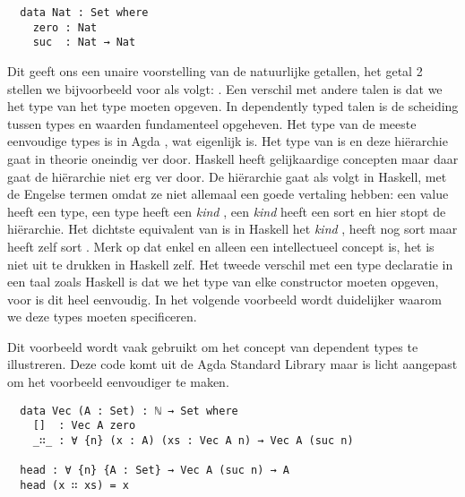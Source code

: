\begin{verbatim}
  data Nat : Set where
    zero : Nat
    suc  : Nat → Nat
\end{verbatim}

Dit geeft ons een unaire voorstelling van de natuurlijke getallen, het getal 2
stellen we bijvoorbeeld voor als volgt: . Een verschil
met andere talen is dat we het type van het type moeten opgeven.  In
dependently typed talen is de scheiding tussen types en waarden fundamenteel
opgeheven. Het type van de meeste eenvoudige types is in Agda , wat
eigenlijk  is. Het type van  is  en deze
hiërarchie gaat in theorie oneindig ver door. Haskell heeft gelijkaardige
concepten maar daar gaat de hiërarchie niet erg ver door. De hiërarchie gaat
als volgt in Haskell, met de Engelse termen omdat ze niet allemaal een goede
vertaling hebben: een value heeft een type, een type heeft een \emph{kind}
\cite{kind}, een \emph{kind} heeft een sort en hier stopt de hiërarchie. Het
dichtste equivalent van  is in Haskell het \emph{kind} \ihask{*},
\ihask{*} heeft nog sort  maar  heeft zelf sort
. Merk op dat  enkel en alleen een intellectueel concept
is, het is niet uit te drukken in Haskell zelf.  Het tweede verschil met een
type declaratie in een taal zoals Haskell is dat we het type van elke
constructor moeten opgeven, voor  is dit heel eenvoudig. In het
volgende voorbeeld wordt duidelijker waarom we deze types moeten specificeren.

Dit voorbeeld wordt vaak gebruikt om het concept van dependent types te
illustreren. Deze code komt uit de Agda Standard Library \cite{agda:stdlib} maar
is licht aangepast om het voorbeeld eenvoudiger te maken.

\begin{verbatim}
  data Vec (A : Set) : ℕ → Set where
    []  : Vec A zero
    _∷_ : ∀ {n} (x : A) (xs : Vec A n) → Vec A (suc n)

  head : ∀ {n} {A : Set} → Vec A (suc n) → A
  head (x ∷ xs) = x
\end{verbatim}

